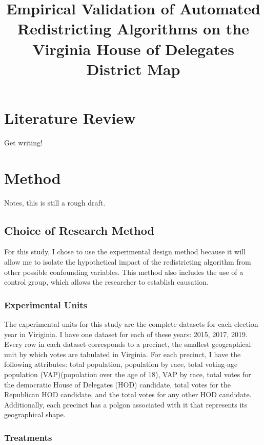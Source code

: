 \documentclass[stu, floatsintext]{apa7}
\title{Empirical Validation of Automated Redistricting Algorithms on the Virginia House of Delegates District Map}
\begin{document}
\maketitle


\section{Literature Review}

Get writing!

\section{Method}

Notes, this is still a rough draft. 

\subsection{Choice of Research Method}

For this study, I chose to use the experimental design method because it will allow me to isolate the hypothetical impact of the redistricting algorithm from other possible confounding variables. This method also includes the use of a control group, which allows the researcher to establish causation. 

\subsubsection{Experimental Units}

The experimental units for this study are the complete datasets for each election year in Viriginia. I have one dataset for each of these years: 2015, 2017, 2019. Every row in each dataset corresponds to a precinct, the smallest geographical unit by which votes are tabulated in Virginia. For each precinct, I have the following attributes: total population, population by race, total voting-age population (VAP)(population over the age of 18), VAP by race, total votes for the democratic House of Delegates (HOD) candidate, total votes for the Republican HOD candidate, and the total votes for any other HOD candidate. Additionally, each precinct has a polgon associated with it that represents its geographical shape. 

\subsubsection{Treatments}
\end{document}
